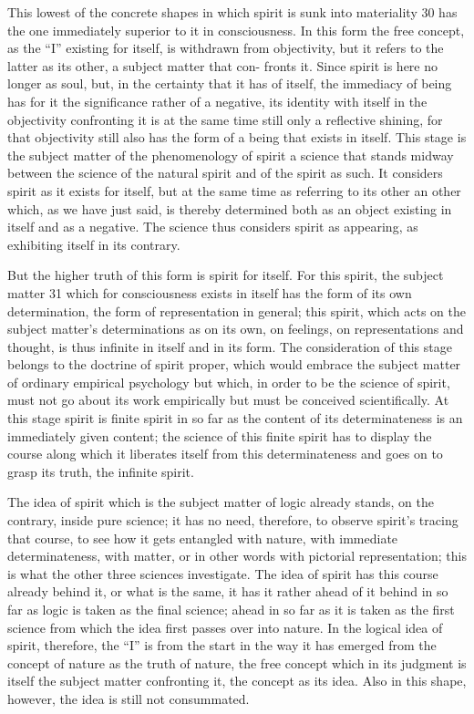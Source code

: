 This lowest of the concrete shapes in which spirit is sunk into
materiality 30 has the one immediately superior to it in consciousness. In
this form the free concept, as the “I” existing for itself, is withdrawn from
objectivity, but it refers to the latter as its other, a subject matter that con-
fronts it. Since spirit is here no longer as soul, but, in the certainty that it
has of itself, the immediacy of being has for it the significance rather of a
negative, its identity with itself in the objectivity confronting it is at the
same time still only a reflective shining, for that objectivity still also has the
form of a being that exists in itself. This stage is the subject matter of the
phenomenology of spirit
 a science that stands midway between the science
of the natural spirit and of the spirit as such. It considers spirit as it exists
for itself, but at the same time as referring to its other
 an other which, as we
have just said, is thereby determined both as an object existing in itself and
as a negative. The science thus considers spirit as appearing, as exhibiting
itself in its contrary.

But the higher truth of this form is spirit for itself. For this spirit, the
subject matter 31 which for consciousness exists in itself has the form of its
own determination, the form of representation in general; this spirit, which
acts on the subject matter's determinations as on its own, on feelings, on
representations and thought, is thus infinite in itself and in its form. The
consideration of this stage belongs to the doctrine of spirit proper, which
would embrace the subject matter of ordinary empirical psychology but
which, in order to be the science of spirit, must not go about its work
empirically but must be conceived scientifically.
 At this stage spirit is
finite spirit in so far as the content of its determinateness is an immediately
given content; the science of this finite spirit has to display the course along
which it liberates itself from this determinateness and goes on to grasp its
truth, the infinite spirit.

The idea of spirit which is the subject matter of logic already stands,
on the contrary, inside pure science; it has no need, therefore, to observe
spirit's tracing that course, to see how it gets entangled with nature, with
immediate determinateness, with matter, or in other words with pictorial
representation; this is what the other three sciences investigate. The idea of
spirit has this course already behind it, or what is the same, it has it rather
ahead of it
 behind in so far as logic is taken as the final science; ahead
in so far as it is taken as the first science from which the idea first passes
over into nature. In the logical idea of spirit, therefore, the “I” is from the
start in the way it has emerged from the concept of nature as the truth of
nature, the free concept which in its judgment is itself the subject matter
confronting it, the concept as its idea. Also in this shape, however, the idea
is still not consummated.


